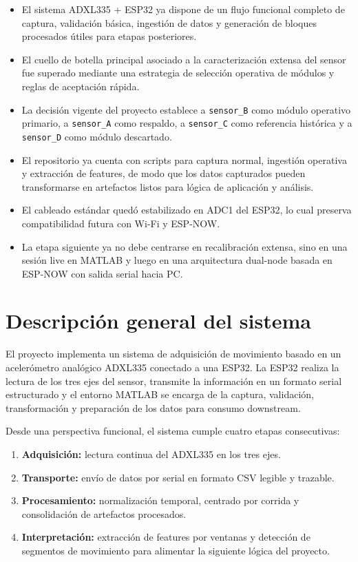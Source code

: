 \documentclass[11pt,a4paper]{article}
\begin{document}
\begin{summarybox}
\begin{itemize}
  \item El sistema ADXL335 + ESP32 ya dispone de un flujo funcional completo de captura, validación básica, ingestión de datos y generación de bloques procesados útiles para etapas posteriores.
  \item El cuello de botella principal asociado a la caracterización extensa del sensor fue superado mediante una estrategia de selección operativa de módulos y reglas de aceptación rápida.
  \item La decisión vigente del proyecto establece a \texttt{sensor\_B} como módulo operativo primario, a \texttt{sensor\_A} como respaldo, a \texttt{sensor\_C} como referencia histórica y a \texttt{sensor\_D} como módulo descartado.
  \item El repositorio ya cuenta con scripts para captura normal, ingestión operativa y extracción de features, de modo que los datos capturados pueden transformarse en artefactos listos para lógica de aplicación y análisis.
  \item El cableado estándar quedó estabilizado en ADC1 del ESP32, lo cual preserva compatibilidad futura con Wi-Fi y ESP-NOW.
  \item La etapa siguiente ya no debe centrarse en recalibración extensa, sino en una sesión live en MATLAB y luego en una arquitectura dual-node basada en ESP-NOW con salida serial hacia PC.
\end{itemize}
\end{summarybox}

\section{Descripción general del sistema}

El proyecto implementa un sistema de adquisición de movimiento basado en un acelerómetro analógico ADXL335 conectado a una ESP32. La ESP32 realiza la lectura de los tres ejes del sensor, transmite la información en un formato serial estructurado y el entorno MATLAB se encarga de la captura, validación, transformación y preparación de los datos para consumo downstream.

Desde una perspectiva funcional, el sistema cumple cuatro etapas consecutivas:

\begin{enumerate}
  \item \textbf{Adquisición:} lectura continua del ADXL335 en los tres ejes.
  \item \textbf{Transporte:} envío de datos por serial en formato CSV legible y trazable.
  \item \textbf{Procesamiento:} normalización temporal, centrado por corrida y consolidación de artefactos procesados.
  \item \textbf{Interpretación:} extracción de features por ventanas y detección de segmentos de movimiento para alimentar la siguiente lógica del proyecto.
\end{enumerate}
\end{document}
